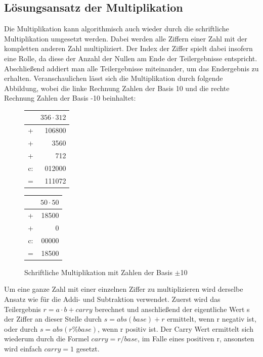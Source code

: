 \documentclass[course=erap]{aspdoc}
\begin{document}
    \subsection{Lösungsansatz der Multiplikation}\label{Multiplikation}

    Die Multiplikation kann algorithmisch auch wieder durch die schriftliche Multiplikation umgesetzt werden.
    Dabei werden alle Ziffern einer Zahl mit der kompletten anderen Zahl multipliziert. Der Index der Ziffer
    spielt dabei insofern eine Rolle, da diese der Anzahl der Nullen am Ende der Teilergebnisse entspricht.
    Abschließend addiert man alle
    Teilergebnisse miteinander, um das Endergebnis zu erhalten. Veranschaulichen lässt sich die Multiplikation durch
    folgende Abbildung, wobei die linke Rechnung Zahlen der Basis 10 und die rechte Rechnung
    Zahlen der Basis -10 beinhaltet: \\

    \begin{figure}[ht]
        \centering
        \captionsetup{justification=centering}
        \begin{center}
            \begin{tabular}{cr}
                & $356 \cdot 312 $ \\\hline
                +  & 106800           \\
                +  & 3560             \\
                +  & 712              \\\hline
                c: & 012000           \\\hline
                =  & 111072
            \end{tabular}
            \qquad \qquad \qquad
            \begin{tabular}{cr}
                & $50 \cdot 50 $ \\\hline
                +  & 18500          \\
                +  & 0              \\\hline
                c: & 00000          \\\hline
                =  & 18500
            \end{tabular}
        \end{center}
        \caption{Schriftliche Multiplikation mit Zahlen der Basis $\pm$10}
    \end{figure}

    Um eine ganze Zahl mit einer einzelnen Ziffer zu multiplizieren wird derselbe Ansatz
    wie für die Addi- und Subtraktion verwendet. Zuerst wird das Teilergebnis $r=a \cdot b + carry$
    berechnet und anschließend der eigentliche Wert s der Ziffer an dieser Stelle durch
    $s=abs(base)+r$ ermittelt, wenn r negativ ist, oder durch $s=abs(r\%base)$, wenn r positiv ist.
    Der Carry Wert ermittelt sich wiederum durch die Formel $carry = r / base$, im Falle eines positiven r,
    ansonsten wird einfach $carry = 1$ gesetzt.
\end{document}
